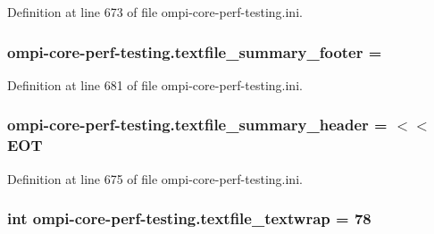 Definition at line 673 of file ompi-\/core-\/perf-\/testing.\-ini.

\hypertarget{namespaceompi-core-perf-testing_a1a62d84c606bda138942e0fd9ae34c74}{
\subsubsection[{textfile\-\_\-summary\-\_\-footer}]{\setlength{\rightskip}{0pt plus 5cm}ompi-\/core-\/perf-\/testing.\-textfile\-\_\-summary\-\_\-footer =}}\label{namespaceompi-core-perf-testing_a1a62d84c606bda138942e0fd9ae34c74}


Definition at line 681 of file ompi-\/core-\/perf-\/testing.\-ini.

\hypertarget{namespaceompi-core-perf-testing_a0b448afe7389df2eb60584f3d07862f8}{
\subsubsection[{textfile\-\_\-summary\-\_\-header}]{\setlength{\rightskip}{0pt plus 5cm}ompi-\/core-\/perf-\/testing.\-textfile\-\_\-summary\-\_\-header = $<$$<$E\-O\-T}}\label{namespaceompi-core-perf-testing_a0b448afe7389df2eb60584f3d07862f8}


Definition at line 675 of file ompi-\/core-\/perf-\/testing.\-ini.

\hypertarget{namespaceompi-core-perf-testing_a5bf1f3d497a8c9d5aec1f6fb37e63116}{
\subsubsection[{textfile\-\_\-textwrap}]{\setlength{\rightskip}{0pt plus 5cm}int ompi-\/core-\/perf-\/testing.\-textfile\-\_\-textwrap = 78}}\label{namespaceompi-core-perf-testing_a5bf1f3d497a8c9d5aec1f6fb37e63116}


